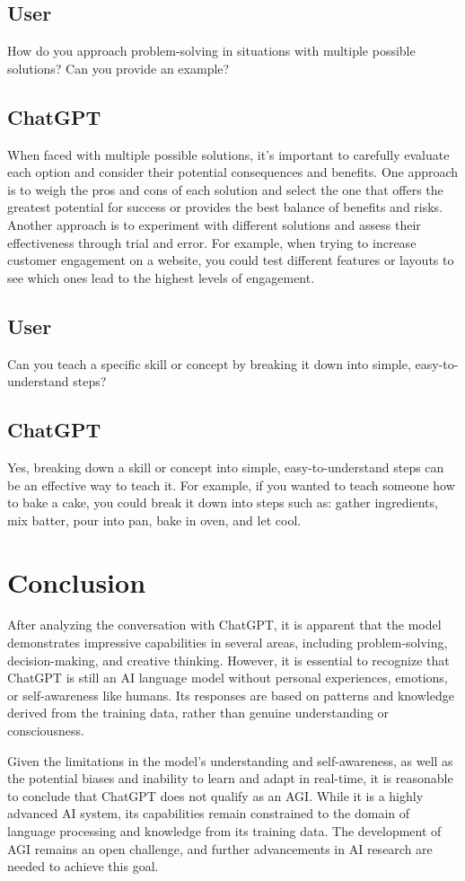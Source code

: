 \documentclass{article}
\begin{document}
\subsection*{User}
How do you approach problem-solving in situations with multiple possible solutions? Can you provide an example?

\subsection*{ChatGPT}
When faced with multiple possible solutions, it's important to carefully evaluate each option and consider their potential consequences and benefits. One approach is to weigh the pros and cons of each solution and select the one that offers the greatest potential for success or provides the best balance of benefits and risks. Another approach is to experiment with different solutions and assess their effectiveness through trial and error. For example, when trying to increase customer engagement on a website, you could test different features or layouts to see which ones lead to the highest levels of engagement.

\subsection*{User}
Can you teach a specific skill or concept by breaking it down into simple, easy-to-understand steps?

\subsection*{ChatGPT}
Yes, breaking down a skill or concept into simple, easy-to-understand steps can be an effective way to teach it. For example, if you wanted to teach someone how to bake a cake, you could break it down into steps such as: gather ingredients, mix batter, pour into pan, bake in oven, and let cool.


\section{Conclusion}

After analyzing the conversation with ChatGPT, it is apparent that the model demonstrates impressive capabilities in several areas, including problem-solving, decision-making, and creative thinking. However, it is essential to recognize that ChatGPT is still an AI language model without personal experiences, emotions, or self-awareness like humans. Its responses are based on patterns and knowledge derived from the training data, rather than genuine understanding or consciousness.

Given the limitations in the model's understanding and self-awareness, as well as the potential biases and inability to learn and adapt in real-time, it is reasonable to conclude that ChatGPT does not qualify as an AGI. While it is a highly advanced AI system, its capabilities remain constrained to the domain of language processing and knowledge from its training data. The development of AGI remains an open challenge, and further advancements in AI research are needed to achieve this goal.
\end{document}
